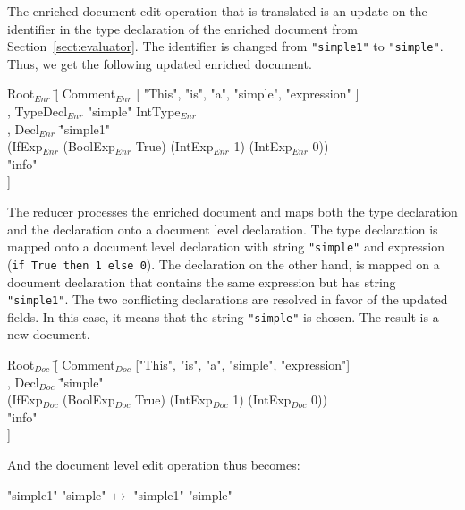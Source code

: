The enriched document edit operation that is translated is an update on the identifier in the type declaration of the enriched document from Section~\ref{sect:evaluator}. The identifier is changed from \verb|"simple1"| to \verb|"simple"|. Thus, we get the following updated enriched document.

\small \ttfamily
\begin{tabbing}
Root$_{Enr}$ \= [ Comment$_{Enr}$ [ "This", "is", "a", "simple", "expression" ]\\
       \> , TypeDecl$_{Enr}$ "simple" IntType$_{Enr}$\\
       \> , Decl$_{Enr}$ \= "simple1"\\
       \>                       \> (IfExp$_{Enr}$ (BoolExp$_{Enr}$ True) (IntExp$_{Enr}$ 1) (IntExp$_{Enr}$ 0)) \\
       \>                       \> "info"\\
       \> ] 
\end{tabbing}
\rmfamily \normalsize

The reducer processes the enriched document and maps both the type declaration and the declaration onto a document level declaration. The type declaration is mapped onto a document level declaration with string \verb|"simple"| and expression (\verb|if True then 1 else 0|). The declaration on the other hand, is mapped on a document declaration that contains the same expression but has string \verb|"simple1"|. The two conflicting declarations are resolved in favor of the updated fields. In this case, it means that the string \verb|"simple"| is chosen. The result is a new document.

\small \ttfamily
\begin{tabbing}
Root$_{Doc}$ \= [ Comment$_{Doc}$ ["This", "is", "a", "simple", "expression"] \\
       \> , Decl$_{Doc}$ \= "simple" \\
       \>                        \>(IfExp$_{Doc}$ (BoolExp$_{Doc}$ True) (IntExp$_{Doc}$ 1) (IntExp$_{Doc}$ 0))\\
       \>                       \> "info"\\
       \> ] 
\end{tabbing}
\rmfamily \normalsize

And the document level edit operation thus becomes:

\small \ttfamily
\begin{tabbing}
 \ttfamily "simple1"  \ttfamily  "simple" $\mapsto$  \ttfamily  "simple1"  \ttfamily  "simple"
\end{tabbing}
\rmfamily \normalsize


